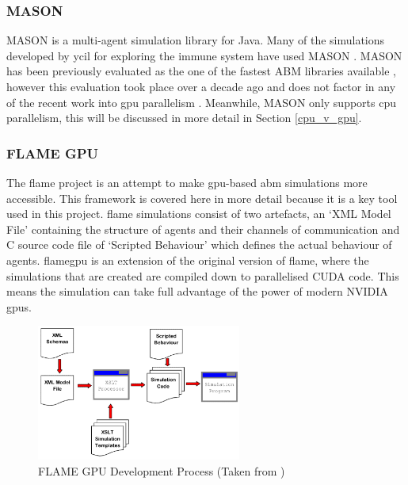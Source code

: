 \documentclass{UoYCSproject}
\begin{document}

\subsubsection{\gls{MASON}}
\gls{MASON} is a multi-agent simulation library for Java.
Many of the simulations developed by \gls{ycil} for exploring the immune system have used \gls{MASON} \cite{kieran_thesis, leishmaniasis, leukocyte, abm_case_studies_ycil}.
\gls{MASON} has been previously evaluated as the one of the fastest ABM libraries available \cite{abm_platforms_review}, however this evaluation took place over a decade ago and does not factor in any of the recent work into \acrshort{gpu} parallelism \cite{flame_simulation, biocellion_paper, physicell}.
Meanwhile, \gls{MASON} only supports \gls{cpu} parallelism, this will be discussed in more detail in Section \ref{cpu_v_gpu}.

\subsubsection{\gls{FLAME GPU}}
\label{flame_gpu}
The \gls{flame} project is an attempt to make \gls{gpu}-based \gls{abm} simulations more accessible.
This framework is covered here in more detail because it is a key tool used in this project.
\gls{flame} simulations consist of two artefacts, an `XML Model File' containing the structure of agents and their channels of communication and C source code file of `Scripted Behaviour' which defines the actual behaviour of agents.
\acrfull{flamegpu} is an extension of the original version of \acrshort{flame}, where the simulations that are created are compiled down to parallelised CUDA code.
This means the simulation can take full advantage of the power of modern NVIDIA \acrshort{gpu}s.

\begin{figure}[htp]
\centering
\includegraphics[width=0.6\textwidth]{Appendix/FLAME_Process}
\caption{\gls{FLAME GPU} Development Process (Taken from \cite{flame_simulation})}
\label{fig:flame_dev}
\end{figure}
\end{document}
